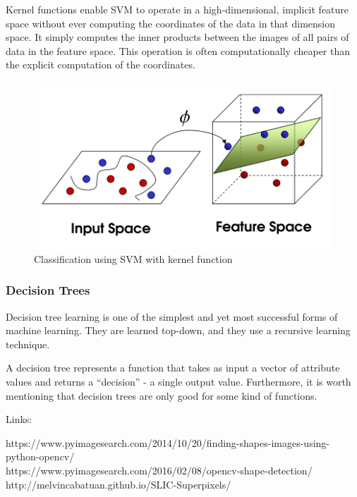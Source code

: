 Kernel functions enable SVM to operate in a high-dimensional, implicit feature space without ever computing the coordinates of the data in that dimension space. It simply computes the inner products between the images of all pairs of data in the feature space. This operation is often computationally cheaper than the explicit computation of the coordinates.

\begin{figure}[!h]
	\centering
	\includegraphics[scale=0.3]{fig/kernel_function.png}
	\caption{Classification using SVM with kernel function \cite{Opencv2017}}
	\label{fig:kernerlfunction}
\end{figure}

\subsubsection*{Decision Trees}
Decision tree learning is one of the simplest and yet most successful forms of machine learning. They are learned top-down, and they use a recursive learning technique.

A decision tree represents a function that takes as input a vector of attribute values and returns a “decision” - a single output value. Furthermore, it is worth mentioning that decision trees are only good for some kind of functions.

Links:

https://www.pyimagesearch.com/2014/10/20/finding-shapes-images-using-python-opencv/\\
https://www.pyimagesearch.com/2016/02/08/opencv-shape-detection/
\\
http://melvincabatuan.github.io/SLIC-Superpixels/
\\
